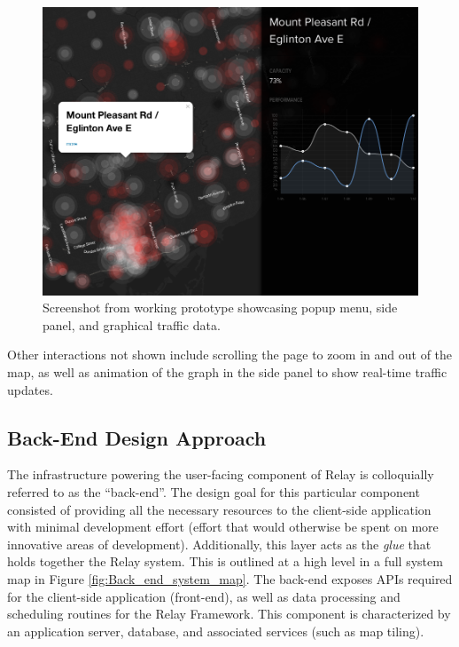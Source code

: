 \documentclass{article}
\begin{document}
\begin{figure}[htbp!]
  \begin{centering}
    \includegraphics[scale=0.47]{figures/screen-1.png}
    \caption{Screenshot from working prototype showcasing popup menu, side panel, and graphical traffic data.}
    \label{fig:screen-2}
  \end{centering}
\end{figure}

Other interactions not shown include scrolling the page to zoom in and out of the map, as well as animation of the graph in the side panel to show real-time traffic updates.\\

\subsection{Back-End Design Approach}

The infrastructure powering the user-facing component of Relay is colloquially referred to as the ``back-end''.
The design goal for this particular component consisted of providing all the necessary resources to the client-side application with minimal development effort (effort that would otherwise be spent on more innovative areas of development).
Additionally, this layer acts as the \emph{glue} that holds together the Relay system.
This is outlined at a high level in a full system map in Figure \ref{fig:Back_end_system_map}.
The back-end exposes APIs required for the client-side application (front-end), as well as data processing and scheduling routines for the Relay Framework.
This component is characterized by an application server, database, and associated services (such as map tiling).\\
\end{document}
